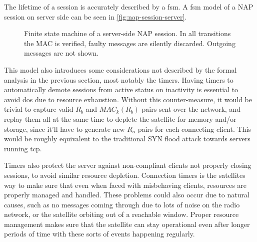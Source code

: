 The lifetime of a \gls{session} is accurately described by a \gls{fsm}. A \gls{fsm} model of a NAP session on server side can be seen in \autoref{fig:nap-session-server}.

\begin{figure}[ht!]
\centering
    \caption{Finite state machine of a server-side NAP session. In all transitions the MAC is verified, faulty messages are silently discarded. Outgoing messages are not shown.}\label{fig:nap-session-server}
\end{figure}

This model also introduces some considerations not described by the formal analysis in the previous section, most notably the timers. Having timers to automatically demote sessions from active status on inactivity is essential to avoid \gls{dos} due to resource exhaustion. Without this counter-measure, it would be trivial to capture valid \(R_b\) and \(MAC_{k}(R_b)\) pairs sent over the network, and replay them all at the same time to deplete the satellite for memory and/or storage, since it'll have to generate new \(R_a\) pairs for each connecting client. This would be roughly equivalent to the traditional SYN flood attack towards servers running \gls{tcp}\cite{syn_flood}.

Timers also protect the server against non-compliant clients not properly closing sessions, to avoid similar resource depletion. Connection timers is the satellites way to make sure that even when faced with misbehaving clients, resources are properly managed and handled. These problems could also occur due to natural causes, such as no messages coming through due to lots of noise on the radio network, or the satellite orbiting out of a reachable window. Proper resource management makes sure that the satellite can stay operational even after longer periods of time with these sorts of events happening regularly.


